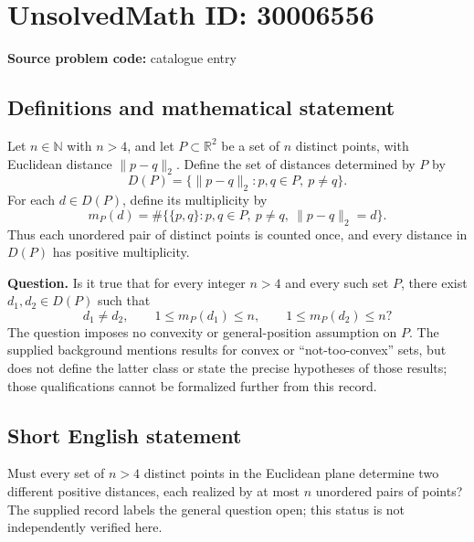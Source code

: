 \documentclass[11pt]{article}
\newcommand{\N}{\mathbb{N}}
\newcommand{\R}{\mathbb{R}}
\begin{document}
\section*{UnsolvedMath ID: 30006556}
\textbf{Source problem code:} catalogue entry
\subsection{Definitions and mathematical statement}
Let \(n\in\N\) with \(n>4\), and let \(P\subset\R^2\) be a set of \(n\) distinct points, with Euclidean distance \(\|p-q\|_2\). Define the set of distances determined by \(P\) by
\[
D(P)=\{\|p-q\|_2:p,q\in P,\ p\ne q\}.
\]
For each \(d\in D(P)\), define its multiplicity by
\[
m_P(d)=\#\bigl\{\{p,q\}:p,q\in P,\ p\ne q,\ \|p-q\|_2=d\bigr\}.
\]
Thus each unordered pair of distinct points is counted once, and every distance in \(D(P)\) has positive multiplicity.

\textbf{Question.} Is it true that for every integer \(n>4\) and every such set \(P\), there exist \(d_1,d_2\in D(P)\) such that
\[
d_1\ne d_2,\qquad 1\le m_P(d_1)\le n,\qquad 1\le m_P(d_2)\le n?
\]
The question imposes no convexity or general-position assumption on \(P\). The supplied background mentions results for convex or ``not-too-convex'' sets, but does not define the latter class or state the precise hypotheses of those results; those qualifications cannot be formalized further from this record.
\subsection{Short English statement}
Must every set of \(n>4\) distinct points in the Euclidean plane determine two different positive distances, each realized by at most \(n\) unordered pairs of points? The supplied record labels the general question open; this status is not independently verified here.
\end{document}
